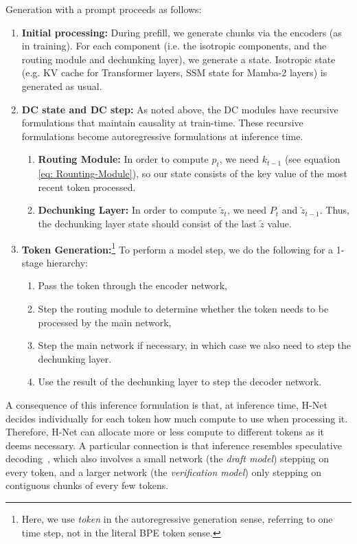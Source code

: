 \documentclass{article}
\newcommand{\citep}{\parencite}
\newcommand{\model}{H-Net}
\newcommand{\dechunk}{dechunking layer}
\newcommand{\DECHUNK}{Dechunking Layer}
\newcommand{\encoder}{encoder network}
\newcommand{\main}{main network}
\newcommand{\decoder}{decoder network}
\newcommand{\router}{routing module}
\newcommand{\ROUTER}{Routing Module}
\theoremstyle{plain}
\theoremstyle{remark}
\begin{document}
Generation with a prompt proceeds as follows:
\begin{enumerate}
    \item \textbf{Initial processing:} During prefill, we generate chunks via the encoders (as in training). For each component (i.e. the isotropic components, and the \router{} and \dechunk{}), we generate a state.  Isotropic state (e.g. KV cache for Transformer layers, SSM state for Mamba-2 layers) is generated as usual.
    \item \textbf{DC state and DC step:} As noted above, the DC modules have recursive formulations that maintain causality at train-time. These recursive formulations become autoregressive formulations at inference time.
    \begin{enumerate}
        \item \textbf{\ROUTER{}:} In order to compute $p_t$, we need $k_{t-1}$ (see equation \eqref{eq: Rounting-Module}), so our state consists of the key value of the most recent token processed.
        \item \textbf{\DECHUNK{}:} In order to compute $\tilde z_t$, we need $P_t$ and $\tilde z_{t-1}$. Thus, the \dechunk{} state should consist of the last $\tilde z$ value.
    \end{enumerate}
    \item \textbf{Token Generation:}\footnote{Here, we use \emph{token} in the autoregressive generation sense, referring to one time step, not in the literal BPE token sense.} To perform a model step, we do the following for a 1-stage hierarchy:
    \begin{enumerate}
        \item Pass the token through the \encoder{},
        \item Step the \router{} to determine whether the token needs to be processed by the \main{},
        \item Step the \main{} if necessary, in which case we also need to step the \dechunk{}.
        \item Use the result of the \dechunk{} to step the \decoder{}.
    \end{enumerate}
\end{enumerate}

A consequence of this inference formulation is that, at inference time, \model{} decides individually for each token how much compute to use when processing it.
Therefore, \model{} can allocate more or less compute to different tokens as it deems necessary.
A particular connection is that inference resembles speculative decoding~\citep{SpeculativeDecoding, SpeculativeSampling},
which also involves a small network (the \emph{draft model}) stepping on every token, and a larger network (the \emph{verification model}) only stepping on contiguous chunks of every few tokens.
\end{document}

